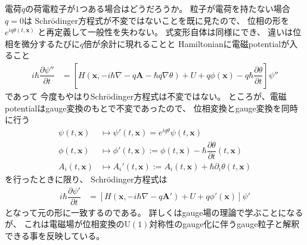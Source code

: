 電荷$q$の荷電粒子が$1$つある場合はどうだろうか。
粒子が電荷を持たない場合$q=0$は
Schr\"odinger方程式が不変ではないことを既に見たので、
位相の形を
$e^{i q \theta (t, \bm{x})}$
と再定義して一般性を失わない。
式変形自体は同様にでき、
違いは位相を微分するたびに$q$倍が余計に現れることと
Hamiltonianに電磁potentialが入ること
\begin{align}
    i\hbar
    \dfrac{\partial \psi''}{\partial t}
&=
    \left[
        H (\bm{x},
        - i \hbar \nabla - q \bm{A}
        - \hbar q \nabla \theta)
    + U
    + q \phi(\bm{x})
    - q \hbar
        \dfrac{\partial \theta}{\partial t}
    \right]
    \psi''
\end{align}
であって
今度もやはりSchr\"odinger方程式は不変ではない。
ところが、電磁potentialはgauge変換のもとで不変であったので、
位相変換とgauge変換を同時に行う
\begin{subequations}
\begin{align}
    \psi (t, \bm{x}) &\mapsto
    \psi' (t, \bm{x})
    = e^{i q \theta} \psi (t, \bm{x})
\\
    \phi (t, \bm{x}) &\mapsto
    \phi' (t, \bm{x}) :=
    \phi (t, \bm{x}) - \hbar
    \dfrac{\partial \theta}{\partial t} (t, \bm{x})
\\
    A_i (t, \bm{x}) &\mapsto
    A_i' (t, \bm{x}) :=
    A_i (t, \bm{x}) + \hbar
    \partial_i \theta (t, \bm{x})
\end{align}
\end{subequations}
を行ったときに限り、
Schr\"odinger方程式は
\begin{align}
    i\hbar
    \dfrac{\partial \psi'}{\partial t}
&=
    \left[
        H (\bm{x},
        - i \hbar \nabla - q \bm{A}')
    + U
    + q \phi' (\bm{x})
    \right]
    \psi'
\end{align}
となって元の形に一致するのである。
詳しくはgauge場の理論で学ぶことになるが、
これは電磁場が位相変換の$\mathrm{U}(1)$対称性のgauge化に伴うgauge粒子と解釈できる事を反映している。

